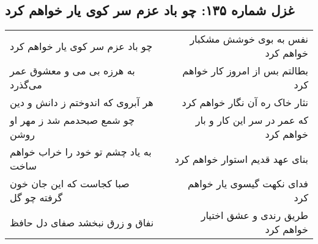 \begin{center}
\section*{غزل شماره ۱۳۵: چو باد عزم سر کوی یار خواهم کرد}
\label{sec:sh135}
\begin{longtable}{l p{0.5cm} r}
چو باد عزم سر کوی یار خواهم کرد
&&
نفس به بوی خوشش مشکبار خواهم کرد
\\
به هرزه بی می و معشوق عمر می‌گذرد
&&
بطالتم بس از امروز کار خواهم کرد
\\
هر آبروی که اندوختم ز دانش و دین
&&
نثار خاک ره آن نگار خواهم کرد
\\
چو شمع صبحدمم شد ز مهر او روشن
&&
که عمر در سر این کار و بار خواهم کرد
\\
به یاد چشم تو خود را خراب خواهم ساخت
&&
بنای عهد قدیم استوار خواهم کرد
\\
صبا کجاست که این جان خون گرفته چو گل
&&
فدای نکهت گیسوی یار خواهم کرد
\\
نفاق و زرق نبخشد صفای دل حافظ
&&
طریق رندی و عشق اختیار خواهم کرد
\\
\end{longtable}
\end{center}
